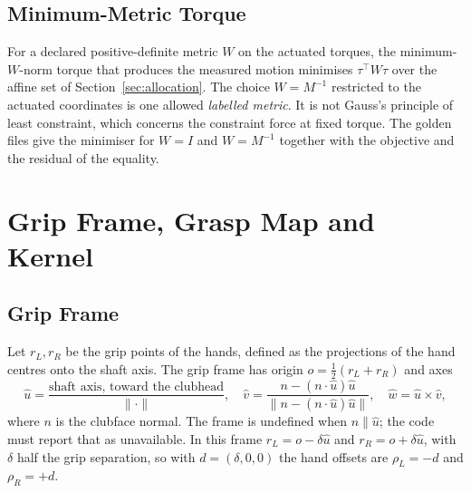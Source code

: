 \documentclass[11pt,a4paper]{article}
\begin{document}
\subsection{Minimum-Metric Torque}

For a declared positive-definite metric $W$ on the actuated torques, the
minimum-$W$-norm torque that produces the measured motion minimises
$\tau^{\top}W\tau$ over the affine set of Section~\ref{sec:allocation}.  The
choice $W=M^{-1}$ restricted to the actuated coordinates is one allowed
\emph{labelled metric}.  It is not Gauss's principle of least constraint, which
concerns the constraint force at fixed torque.  The golden files give the
minimiser for $W=I$ and $W=M^{-1}$ together with the objective and the
residual of the equality.

\section{Grip Frame, Grasp Map and Kernel}
\label{sec:grasp}

\subsection{Grip Frame}
Let $r_L,r_R$ be the grip points of the hands, defined as the projections of the
hand centres onto the shaft axis.  The grip frame has origin
$o=\tfrac12(r_L+r_R)$ and axes
\begin{equation}
\hat u=\frac{\text{shaft axis, toward the clubhead}}{\lVert\cdot\rVert},\quad
\hat v=\frac{n-(n\cdot\hat u)\hat u}{\lVert n-(n\cdot\hat u)\hat u\rVert},\quad
\hat w=\hat u\times\hat v,
\end{equation}
where $n$ is the clubface normal.  The frame is undefined when $n\parallel\hat
u$; the code must report that as unavailable.  In this frame $r_L=o-\delta
\hat u$ and $r_R=o+\delta\hat u$, with $\delta$ half the grip separation, so
with $d=(\delta,0,0)$ the hand offsets are $\rho_L=-d$ and $\rho_R=+d$.
\end{document}
